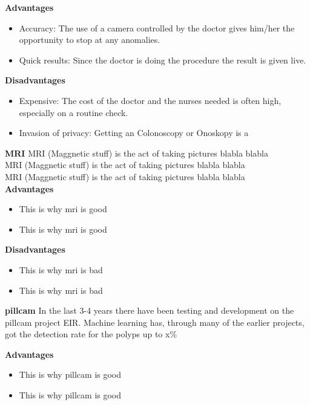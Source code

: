 	\textbf{Advantages}
	  \begin{itemize}
	    \item Accuracy: The use of a camera controlled by the doctor gives him/her the opportunity to stop at any anomalies.
	    \item Quick results: Since the doctor is doing the procedure the result is given live.
	  \end{itemize}

	\vspace{5px}
	\textbf{Disadvantages}
	  \begin{itemize}
	    \item Expensive: The cost of the doctor and the nurses needed is often high, especially on a routine check.
	    \item Invasion of privacy: Getting an Colonoscopy or Onoskopy is a %
	  \end{itemize}
	
    \vspace{10px}
	\textbf{MRI}
	MRI (Maggnetic stuff) is the act of taking pictures blabla blabla\\
	MRI (Maggnetic stuff) is the act of taking pictures blabla blabla\\
	MRI (Maggnetic stuff) is the act of taking pictures blabla blabla\\
	\textbf{Advantages}
	  \begin{itemize}
	    \item This is why mri is good %
	    \item This is why mri is good %
	  \end{itemize}

	\vspace{5px}
	\textbf{Disadvantages}
	  \begin{itemize}
	    \item This is why mri is bad %
	    \item This is why mri is bad %
	  \end{itemize}
    \vspace{10px}
	\textbf{pillcam}
	In the last 3-4 years there have been testing and development on the pillcam project EIR. Machine learning has, through 
	many of the earlier projects, got the detection rate for the polyps up to x\% %
	
	\textbf{Advantages}
	  \begin{itemize}
	    \item This is why pillcam is good %
	    \item This is why pillcam is good %
	  \end{itemize}


